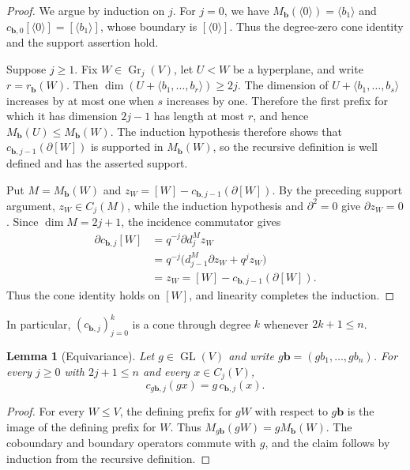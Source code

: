 \documentclass[11pt]{article}
\numberwithin{equation}{section}
\newtheorem{lemma}[theorem]{Lemma}
\newcommand{\Gr}{\operatorname{Gr}}
\begin{document}
\begin{proof}
We argue by induction on $j$. For $j=0$, we have
$M_{\mathbf b}(\langle0\rangle)=\langle b_1\rangle$ and
$c_{\mathbf b,0}[\langle0\rangle]=[\langle b_1\rangle]$, whose
boundary is $[\langle0\rangle]$. Thus the degree-zero cone identity
and the support assertion hold.

Suppose $j\ge1$. Fix $W\in\Gr_j(V)$, let $U<W$ be a hyperplane, and
write $r=r_{\mathbf b}(W)$. Then
$\dim(U+\langle b_1,\ldots,b_r\rangle)\ge2j$. The dimension of
$U+\langle b_1,\ldots,b_s\rangle$ increases by at most one when $s$
increases by one. Therefore the first prefix for which it has
dimension $2j-1$ has length at most $r$, and hence
$M_{\mathbf b}(U)\le M_{\mathbf b}(W)$. The induction hypothesis
therefore shows that
$c_{\mathbf b,j-1}(\partial[W])$ is supported in
$M_{\mathbf b}(W)$, so the recursive definition is well defined and
has the asserted support.

Put $M=M_{\mathbf b}(W)$ and
$z_W=[W]-c_{\mathbf b,j-1}(\partial[W])$. By the preceding support
argument, $z_W\in C_j(M)$, while the induction hypothesis and
$\partial^2=0$ give $\partial z_W=0$. Since $\dim M=2j+1$, the
incidence commutator gives
\[
\begin{aligned}
 \partial c_{\mathbf b,j}[W]
 &=
 q^{-j}\partial d_j^M z_W \\
 &=
 q^{-j}\bigl(d_{j-1}^M\partial z_W+q^jz_W\bigr) \\
 &=
 z_W
 =
 [W]-c_{\mathbf b,j-1}(\partial[W]).
\end{aligned}
\]
Thus the cone identity holds on $[W]$, and linearity completes the
induction.
\end{proof}

In particular, $(c_{\mathbf b,j})_{j=0}^k$ is a cone through degree
$k$ whenever $2k+1\le n$.

\begin{lemma}[Equivariance]\label{lem:cone-equivariance}
Let $g\in\operatorname{GL}(V)$ and write
$g\mathbf b=(gb_1,\ldots,gb_n)$. For every $j\ge0$ with
$2j+1\le n$ and every $x\in C_j(V)$,
\[
 c_{g\mathbf b,j}(gx)=g\,c_{\mathbf b,j}(x).
\]
\end{lemma}

\begin{proof}
For every $W\le V$, the defining prefix for $gW$ with respect to
$g\mathbf b$ is the image of the defining prefix for $W$. Thus
$M_{g\mathbf b}(gW)=gM_{\mathbf b}(W)$. The coboundary and boundary
operators commute with $g$, and the claim follows by induction from
the recursive definition.
\end{proof}
\end{document}
